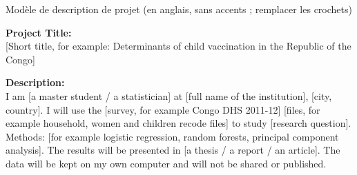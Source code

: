 \documentclass[11pt]{article}
\begin{document}
\begin{modele}{Modèle de description de projet (en anglais, sans accents ; remplacer les crochets)}
\raggedright
\textbf{Project Title:}\\
{}[Short title, for example: Determinants of child vaccination in the Republic of the Congo]
\medskip

\textbf{Description:}\\
I am [a master student / a statistician] at [full name of the institution], [city, country]. I will use the [survey, for example Congo DHS 2011-12] [files, for example household, women and children recode files] to study [research question]. Methods: [for example logistic regression, random forests, principal component analysis]. The results will be presented in [a thesis / a report / an article]. The data will be kept on my own computer and will not be shared or published.
\end{modele}
\end{document}
